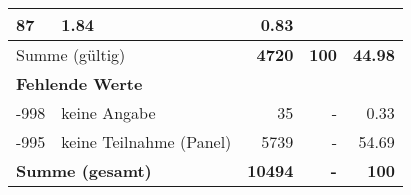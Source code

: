 \begin{longtable}{lXrrr}
       \num{87} &
       \num[round-mode=places,round-precision=2]{1.84} &
         \num[round-mode=places,round-precision=2]{0.83} \\
     \midrule
     \multicolumn{2}{l}{Summe (gültig)} &
       \textbf{\num{4720}} &
     \textbf{\num{100}} &
       \textbf{\num[round-mode=places,round-precision=2]{44.98}} \\
     \multicolumn{5}{l}{\textbf{Fehlende Werte}}\\
       -998 &
       keine Angabe &
         \num{35} &
        - &
         \num[round-mode=places,round-precision=2]{0.33} \\
       -995 &
       keine Teilnahme (Panel) &
         \num{5739} &
        - &
         \num[round-mode=places,round-precision=2]{54.69} \\
     \midrule
     \multicolumn{2}{l}{\textbf{Summe (gesamt)}} &
          \textbf{\num{10494}} &
        \textbf{-} &
        \textbf{\num{100}} \\
     \bottomrule
     \end{longtable}
     
